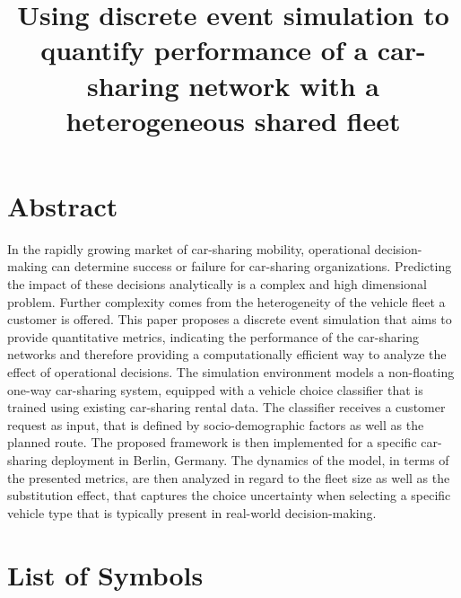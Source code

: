 \documentclass[a4paper, oneside, 12pt]{article}
\title{Using discrete event simulation to quantify performance of a car-sharing network with a heterogeneous shared fleet}
\begin{document}




\clearpage
\thispagestyle{empty}
\section*{Abstract}


In the rapidly growing market of car-sharing mobility, operational decision-making
can determine success or failure for car-sharing organizations. Predicting the impact
of these decisions analytically is a complex and high dimensional problem. Further complexity
comes from the heterogeneity of the vehicle fleet a customer is offered.
This paper proposes
a discrete event simulation that aims to provide quantitative metrics,
indicating the performance of the car-sharing networks and therefore providing a computationally
efficient way to analyze the effect of operational decisions. The simulation environment models a non-floating
one-way car-sharing system, equipped with a vehicle choice classifier that
is trained using existing car-sharing rental data. The classifier receives a customer request as input,
that is defined by socio-demographic factors as well as the planned route.
The proposed framework is then implemented for a specific car-sharing deployment in Berlin, Germany.
The dynamics of the model, in terms of the presented metrics,
are then analyzed in regard to the fleet size as well as the substitution effect, that
captures the choice uncertainty when selecting a specific vehicle type
that is typically present in real-world
decision-making. 



\clearpage
{}
\tableofcontents
\clearpage
\listoffigures
\clearpage
\listoftables

\section*{List of Symbols}
\end{document}
